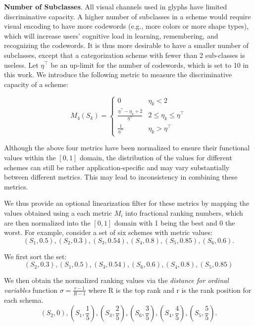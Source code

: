 \textbf{Number of Subclasses}.
All visual channels used in glyphs have limited discriminative capacity.
A higher number of subclasses in a scheme would require visual encoding to have more codewords (e.g., more colors or more shape types), which will increase users' cognitive load in learning, remembering, and recognizing the codewords.
It is thus more desirable to have a smaller number of subclasses, except that a categorization scheme with fewer than 2 sub-classes is useless.
Let $\eta^{\top}$ be an up-limit for the number of codewords, which is set to 10 in this work.
We introduce the following metric to measure the discriminative capacity of a scheme:

\begin{equation}
\label{eq:Branch}
  M_4(S_k) = \begin{cases}
    0 & \eta_k < 2 \\
    \frac{\eta^{\top}-\eta_k+2}{\eta^{\top}} & 2 \leq \eta_k \leq \eta^{\top} \\
    \frac{1}{\eta^{\top}} & \eta_k > \eta^{\top}
  \end{cases}
\end {equation}

Although the above four metrics have been normalized to ensure their functional values within the $[0, 1]$ domain, the distribution of the values for different schemes can still be rather application-specific and may vary substantially between different metrics. This may lead to inconsistency in combining these metrics.

We thus provide an optional linearization filter for these metrics by mapping the values obtained using a each metric $M_i$ into fractional ranking numbers, which are then normalized into the $[0, 1]$ domain with 1 being the best and 0 the worst. For example, consider a set of six schemes with metric values:
%
%
\[
  (S_1, 0.5), (S_2, 0.3), (S_3, 0.54), (S_4, 0.8), (S_5, 0.85), (S_6, 0.6).
\]

\noindent We first sort the set:
\[
 (S_2, 0.3), (S_1, 0.5), (S_3, 0.54), (S_6, 0.6), (S_4, 0.8), (S_5, 0.85)
\]

\noindent We then obtain the normalized ranking values via the \emph{distance for ordinal variables} function $\sigma=\frac{r-1}{R-1}$ where R is the top rank and r is the rank position for each schema.
\[
  (S_2, 0), (S_1, \frac{1}{5}), (S_3, \frac{2}{5}), (S_6, \frac{3}{5}), (S_4, \frac{4}{5}), (S_5, \frac{5}{5}).
\]

